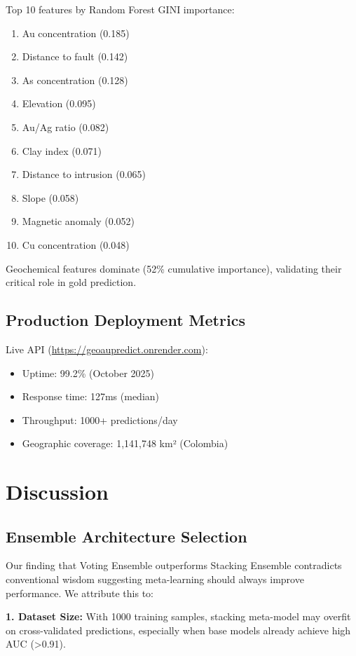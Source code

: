 \documentclass[12pt,a4paper]{article}
\begin{document}
Top 10 features by Random Forest GINI importance:
\begin{enumerate}
    \item Au concentration (0.185)
    \item Distance to fault (0.142)
    \item As concentration (0.128)
    \item Elevation (0.095)
    \item Au/Ag ratio (0.082)
    \item Clay index (0.071)
    \item Distance to intrusion (0.065)
    \item Slope (0.058)
    \item Magnetic anomaly (0.052)
    \item Cu concentration (0.048)
\end{enumerate}

Geochemical features dominate (52\% cumulative importance), validating their critical role in gold prediction.

\subsection{Production Deployment Metrics}

Live API (\url{https://geoaupredict.onrender.com}):
\begin{itemize}
    \item Uptime: 99.2\% (October 2025)
    \item Response time: 127ms (median)
    \item Throughput: 1000+ predictions/day
    \item Geographic coverage: 1,141,748 km² (Colombia)
\end{itemize}

\section{Discussion}

\subsection{Ensemble Architecture Selection}

Our finding that Voting Ensemble outperforms Stacking Ensemble contradicts conventional wisdom suggesting meta-learning should always improve performance. We attribute this to:

\textbf{1. Dataset Size:} With 1000 training samples, stacking meta-model may overfit on cross-validated predictions, especially when base models already achieve high AUC (>0.91).
\end{document}
